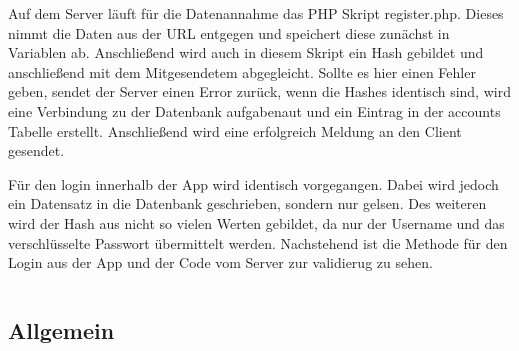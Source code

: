 Auf dem Server läuft für die Datenannahme das PHP Skript register.php. Dieses nimmt die Daten aus der URL entgegen und speichert diese zunächst in Variablen ab. Anschließend wird auch in diesem Skript ein Hash gebildet und anschließend mit dem Mitgesendetem abgegleicht. Sollte es hier einen Fehler geben, sendet der Server einen Error zurück, wenn die Hashes identisch sind, wird eine Verbindung zu der Datenbank aufgabenaut und ein Eintrag in der accounts Tabelle erstellt. Anschließend wird eine erfolgreich Meldung an den Client gesendet.

Für den login innerhalb der App wird identisch vorgegangen. Dabei wird jedoch ein Datensatz in die Datenbank geschrieben, sondern nur gelsen. Des weiteren wird der Hash aus nicht so vielen Werten gebildet, da nur der Username und das verschlüsselte Passwort übermittelt werden. Nachstehend ist die Methode für den Login aus der App und der Code vom Server zur validierug zu sehen.

\begin{scriptsize}
\lstset{
	float,
	caption=Skript SendDataToServer.cs, 
	language=[Sharp]C, 
	frame=single,  
	showstringspaces=false, 
	showspaces=false, 
	numbers=left, 
	captionpos=b, 
	belowcaptionskip=4pt,
	basicstyle=\ttfamily
} 
\begin{lstlisting}[label=lst:c_Login]

\end{lstlisting}
\end{scriptsize}

\subsection{Allgemein}
